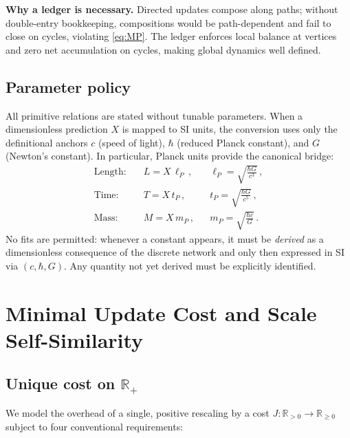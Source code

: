 \documentclass[11pt]{article}
\theoremstyle{definition}
\theoremstyle{remark}
\begin{document}
\medskip
\textbf{Why a ledger is necessary.}
Directed updates compose along paths; without double-entry bookkeeping, compositions would be path-dependent and fail to close on cycles, violating \eqref{eq:MP}. The ledger enforces local balance at vertices and zero net accumulation on cycles, making global dynamics well defined.

\subsection{Parameter policy}

All primitive relations are stated without tunable parameters. When a dimensionless prediction \(X\) is mapped to SI units, the conversion uses only the definitional anchors \(c\) (speed of light), \(\hbar\) (reduced Planck constant), and \(G\) (Newton’s constant). In particular, Planck units provide the canonical bridge:
\begin{align}
\text{Length:}\quad & L = X\,\ell_P\,, && \ell_P=\sqrt{\frac{\hbar G}{c^{3}}}\,,\\
\text{Time:}\quad & T = X\,t_P\,, && t_P=\sqrt{\frac{\hbar G}{c^{5}}}\,,\\
\text{Mass:}\quad & M = X\,m_P\,, && m_P=\sqrt{\frac{\hbar c}{G}}\,.
\end{align}
No fits are permitted: whenever a constant appears, it must be \emph{derived} as a dimensionless consequence of the discrete network and only then expressed in SI via \((c,\hbar,G)\). Any quantity not yet derived must be explicitly identified.


\section{Minimal Update Cost and Scale Self-Similarity}

\subsection{Unique cost on \texorpdfstring{$\mathbb{R}_+$}{R+}}
We model the overhead of a single, positive rescaling by a cost \(J:\mathbb{R}_{>0}\to\mathbb{R}_{\ge 0}\) subject to four conventional requirements:
\end{document}
